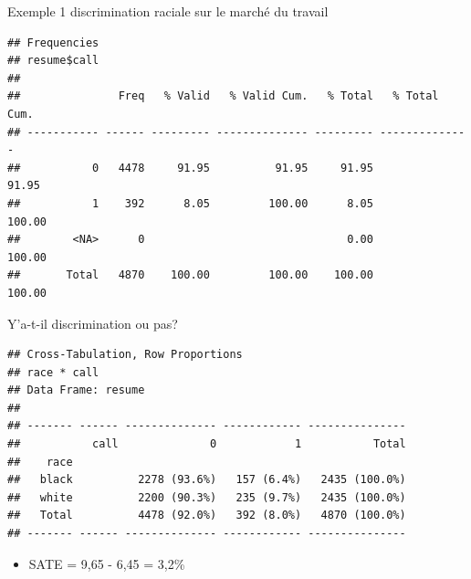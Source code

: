 \documentclass[ignorenonframetext,]{beamer}
\newenvironment{Shaded}{\begin{snugshade}}{\end{snugshade}}
\newcommand{\KeywordTok}[1]{\textcolor[rgb]{0.13,0.29,0.53}{\textbf{#1}}}
\newcommand{\NormalTok}[1]{#1}
\newcommand{\OperatorTok}[1]{\textcolor[rgb]{0.81,0.36,0.00}{\textbf{#1}}}
\providecommand{\tightlist}{%
  \setlength{\itemsep}{0pt}\setlength{\parskip}{0pt}}
\begin{document}
\begin{frame}[fragile]{Exemple 1 discrimination raciale sur le marché du
travail}
\protect\hypertarget{exemple-1-discrimination-raciale-sur-le-marche-du-travail-8}{}

\begin{Shaded}
\end{Shaded}

\begin{verbatim}
## Frequencies  
## resume$call  
## 
##               Freq   % Valid   % Valid Cum.   % Total   % Total Cum.
## ----------- ------ --------- -------------- --------- --------------
##           0   4478     91.95          91.95     91.95          91.95
##           1    392      8.05         100.00      8.05         100.00
##        <NA>      0                               0.00         100.00
##       Total   4870    100.00         100.00    100.00         100.00
\end{verbatim}

\end{frame}

\begin{frame}[fragile]{Y'a-t-il discrimination ou pas?}
\protect\hypertarget{ya-t-il-discrimination-ou-pas}{}

\begin{Shaded}
\end{Shaded}

\begin{verbatim}
## Cross-Tabulation, Row Proportions  
## race * call  
## Data Frame: resume  
## 
## ------- ------ -------------- ------------ ---------------
##           call              0            1           Total
##    race                                                   
##   black          2278 (93.6%)   157 (6.4%)   2435 (100.0%)
##   white          2200 (90.3%)   235 (9.7%)   2435 (100.0%)
##   Total          4478 (92.0%)   392 (8.0%)   4870 (100.0%)
## ------- ------ -------------- ------------ ---------------
\end{verbatim}

\begin{itemize}
\tightlist
\item
  SATE = 9,65 - 6,45 = 3,2\%
\end{itemize}

\end{frame}
\end{document}
